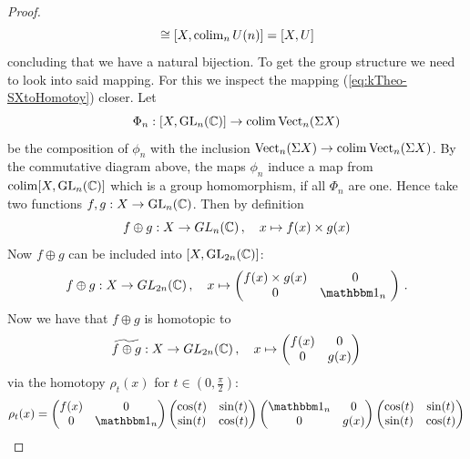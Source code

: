 \begin{proof}
	\begin{equation*}
		[X,\colim_n\GL_n(\C)]\cong [X,\colim_nU(n)]=[X,U]
	\end{equation*} concluding that we have a natural bijection. To get the group structure we need to look into said mapping. For this we inspect the mapping (\ref{eq:kTheo-SXtoHomotoy}) closer. Let 
	\begin{equation*}
		\Phi_n:[X,\mathrm{GL}_n(\mathbb{C})]\to \operatorname{\mathrm{colim}} \operatorname{\mathrm{Vect}}_n(\Sigma X)
	\end{equation*} be the composition of $\phi_n$ with the inclusion $\operatorname{\mathrm{Vect}}_n(\Sigma X) \to \operatorname{\mathrm{colim}} \operatorname{\mathrm{Vect}}_n(\Sigma X)$. By the commutative diagram above, the maps $\phi_n$ induce a map from $\operatorname{\mathrm{colim}} [X,\mathrm{GL}_n(\mathbb{C})]$ which is a group homomorphism, if all $\Phi_n$ are one. Hence take two functions $f,g:X\to \mathrm{GL}_n(\mathbb{C})$. Then by definition
	\begin{equation*}
		f\oplus g: X \to GL_n(\mathbb{C})\,,\quad x\mapsto f(x)\times g(x)
	\end{equation*} Now $f\oplus g$ can be included into $[X,\mathrm{GL}_{2n}(\mathbb{C})]$:
	\begin{equation*}
		f\oplus g: X \to GL_{2n}(\C)\,,\quad x\mapsto \begin{pmatrix}
			f(x)\times g(x) & 0 \\
			0& \Idm_n\
		\end{pmatrix}\,.
	\end{equation*}
	Now we have that $f\oplus g$ is homotopic to 
	\begin{equation*}
		\widetilde{f\oplus g}:X \to GL_{2n}(\mathbb{C})\,, \quad 		x \mapsto\begin{pmatrix}
			f(x) & 0 \\
			0& g(x)
		\end{pmatrix} 
	\end{equation*} via the homotopy $\rho_t(x)$ for $t\in (0,\frac{\pi}{2})$:
	\begin{equation} \label{eq:kTHeo-homotopyBetweendirectSumAndProduct}
		\rho_t(x)=
		\begin{pmatrix}	f(x)&0		   \\0&\Idm_n 		  \end{pmatrix}
		\begin{pmatrix}	\cos(t)&\sin(t)\\ \sin(t)&\cos(t) \end{pmatrix}
		\begin{pmatrix} \Idm_n &0	   \\0&g(x)			  \end{pmatrix}
		\begin{pmatrix}	\cos(t)&\sin(t)\\ \sin(t)&\cos(t) \end{pmatrix}

\end{equation}
\end{proof}
